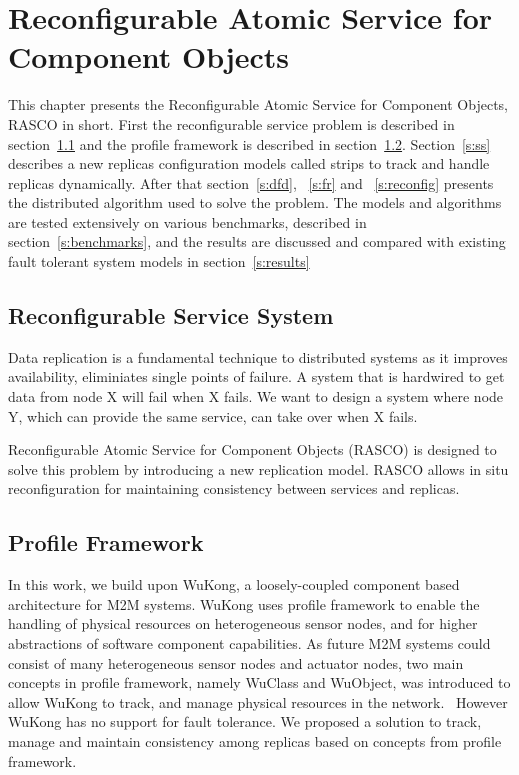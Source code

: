 \cleardoublepage
\singlespacing
\chapter{Reconfigurable Atomic Service for Component Objects}
\label{c:rasco}
\doublespacing\nointerlineskip

This chapter presents the Reconfigurable Atomic Service for Component Objects,
RASCO in short. First the reconfigurable service problem is described in
section~\ref{s:rss} and the profile framework is described in section~\ref{s:pf}.
Section~\ref{s:ss} describes a new replicas configuration models called strips
to track and handle replicas dynamically. After that section~\ref{s:dfd},
~\ref{s:fr} and ~\ref{s:reconfig} presents the distributed algorithm used to
solve the problem. The models and algorithms are tested extensively on various
benchmarks, described in section~\ref{s:benchmarks}, and the results are
discussed and compared with existing fault tolerant system models in
section~\ref{s:results}

\section{Reconfigurable Service System}
\label{s:rss}

Data replication is a fundamental technique to distributed systems as it improves
availability, eliminiates single points of failure. A system that is hardwired
to get data from node X will fail when X fails. We want to design a system
where node Y, which can provide the same service, can take over when X fails.

Reconfigurable Atomic Service for Component Objects (RASCO) is
designed to solve this problem by introducing a new replication model. RASCO
allows in situ reconfiguration for maintaining consistency between services and
replicas.

\section{Profile Framework}
\label{s:pf}

In this work, we build upon WuKong, a loosely-coupled component based
architecture for M2M systems. WuKong uses profile
framework to enable the handling of physical resources on heterogeneous sensor
nodes, and for higher abstractions of software component capabilities. As
future M2M systems could consist of many heterogeneous sensor nodes and
actuator nodes, two main concepts in profile framework, namely WuClass and
WuObject, was introduced to allow WuKong to track, and manage physical
resources in the network.~\cite{Reijers} However WuKong has no support for
fault tolerance. We proposed a solution to track, manage and maintain
consistency among replicas based on concepts from profile framework.

